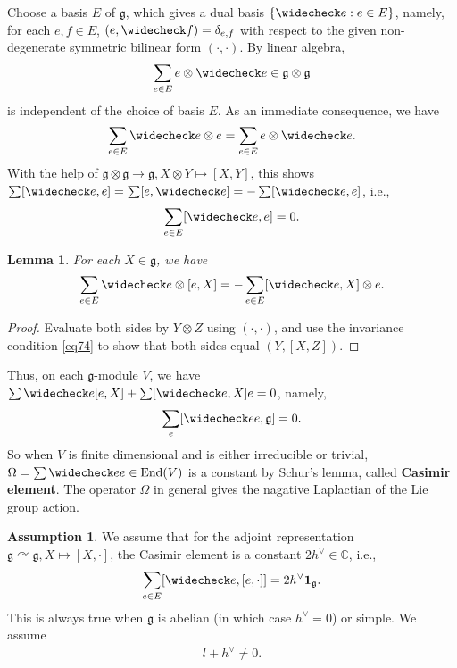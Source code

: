 \documentclass[11pt,b5paper,notitlepage]{article}
\theoremstyle{definition}
\newtheorem{ass}[df]{Assumption}
\theoremstyle{plain}
\newtheorem{lm}[df]{Lemma}
\newcommand{\wch}{\widecheck}
\newcommand{\End}{\mathrm{End}} %
\newcommand{\id}{\mathbf{1}}
\newcommand{\gk}{\mathfrak g}
\newcommand{\Cbb}{\mathbb C}
\numberwithin{equation}{section}
\begin{document}
Choose a basis $E$ of $\gk$, which gives a dual basis $\{\wch e:e\in E\}$, namely, for each $e,f\in E$, $(e,\wch f)=\delta_{e,f}$ with respect to the given non-degenerate symmetric bilinear form $(\cdot,\cdot)$. By linear algebra,
\begin{align}
\sum_{e\in E}e\otimes \wch e\in\gk\otimes \gk	
\end{align}
is independent of the choice of basis $E$. As an immediate consequence, we have
\begin{align}
\sum_{e\in E} \wch e\otimes e=\sum_{e\in E} e\otimes\wch e.\label{eq77}
\end{align}
With the help of $\gk\otimes\gk\rightarrow \gk,X\otimes Y\mapsto[X,Y]$, this shows $\sum[\wch e,e]=\sum[e,\wch e]=-\sum[\wch e,e]$, i.e.,
\begin{align}
\sum_{e\in E}[\wch e,e]=0.\label{eq81}
\end{align}
\begin{lm}\label{lb50}
For each $X\in\gk$, we have
\begin{align}
	\sum_{e\in E}\wch e\otimes [e,X]=-\sum_{e\in E}[\wch e,X]\otimes e.
\end{align}
\end{lm}
\begin{proof}
Evaluate both sides by $Y\otimes Z$ using $(\cdot,\cdot)$, and use the invariance condition \eqref{eq74} to show that both sides equal $(Y,[X,Z])$.
\end{proof}
Thus, on each $\gk$-module $V$, we have $\sum \wch e[e,X]+\sum [\wch e,X]e=0$, namely,
\begin{align}
\sum_e [\wch ee,\gk]=0.	
\end{align}
So when $V$ is finite dimensional and  is either irreducible or trivial, $\Omega=\sum \wch ee\in\End(V)$ is a constant by Schur's lemma, called \textbf{Casimir element}. The operator $\Omega$ in general gives the nagative Laplactian of the Lie group action.

\begin{ass}\label{lb52}
We assume that for the adjoint representation $\gk\curvearrowright\gk,X\mapsto [X,\cdot]$, the Casimir element is a constant $2h^\vee\in\Cbb$, i.e., 
\begin{align}
\sum_{e\in E}[\wch e,[e,\cdot]]=2h^\vee\id_\gk.	
\end{align}
This is always true when $\gk$ is abelian (in which case $h^\vee=0$) or simple. We assume
\begin{align*}
	l+h^\vee\neq0.
\end{align*}
\end{ass}
\end{document}
